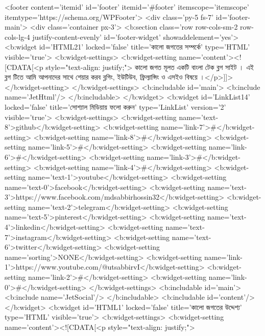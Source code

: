 {{{{  <footer content='itemid' id='footer' itemid='#footer' itemscope='itemscope' itemtype='https://schema.org/WPFooter'>
<div class='py-5 fs-7' id='footer-main'>
  <div class='container px-3'>
    <b:section class='row row-cols-sm-2 row-cols-lg-4 justify-content-evenly' id='footer-widget' showaddelement='yes'>
      <b:widget id='HTML21' locked='false' title='কালো জগতের সম্পর্কে' type='HTML' visible='true'>
        <b:widget-settings>
          <b:widget-setting name='content'><![CDATA[<p style="text-align: justify;"> কালো জগত মূলত একটি বাংলা টেক ব্লগ সাইট । এই ব্লগ টিতে আমি আপনাদের সাথে শেয়ার করব ব্লগিং, ইউটিউব, ফ্রিল্যান্সিং ও এসইও বিষয়ে ।</p>]]></b:widget-setting>
        </b:widget-settings>
        <b:includable id='main'>
      <b:include name='JetHtml'/>
    </b:includable>
      </b:widget>
      <b:widget id='LinkList14' locked='false' title='সোশ্যাল মিডিয়ায় ফলো করুন' type='LinkList' version='2' visible='true'>
        <b:widget-settings>
          <b:widget-setting name='text-8'>github</b:widget-setting>
          <b:widget-setting name='link-7'>#</b:widget-setting>
          <b:widget-setting name='link-8'>#</b:widget-setting>
          <b:widget-setting name='link-5'>#</b:widget-setting>
          <b:widget-setting name='link-6'>#</b:widget-setting>
          <b:widget-setting name='link-3'>#</b:widget-setting>
          <b:widget-setting name='link-4'>#</b:widget-setting>
          <b:widget-setting name='text-1'>youtube</b:widget-setting>
          <b:widget-setting name='text-0'>facebook</b:widget-setting>
          <b:widget-setting name='text-3'>https://www.facebook.com/mdsabbirhossin32</b:widget-setting>
          <b:widget-setting name='text-2'>telegram</b:widget-setting>
          <b:widget-setting name='text-5'>pinterest</b:widget-setting>
          <b:widget-setting name='text-4'>linkedin</b:widget-setting>
          <b:widget-setting name='text-7'>instagram</b:widget-setting>
          <b:widget-setting name='text-6'>twitter</b:widget-setting>
          <b:widget-setting name='sorting'>NONE</b:widget-setting>
          <b:widget-setting name='link-1'>https://www.youtube.com/@utsabbirvI</b:widget-setting>
          <b:widget-setting name='link-2'>#</b:widget-setting>
          <b:widget-setting name='link-0'>#</b:widget-setting>
        </b:widget-settings>
        <b:includable id='main'>
          <b:include name='JetSocial'/>
        </b:includable>
        <b:includable id='content'/>
      </b:widget>
      <b:widget id='HTML1' locked='false' title='কালো জগতের উদ্দেশ্য' type='HTML' visible='true'>
        <b:widget-settings>
          <b:widget-setting name='content'><![CDATA[<p style="text-align: justify;">
}}}}
